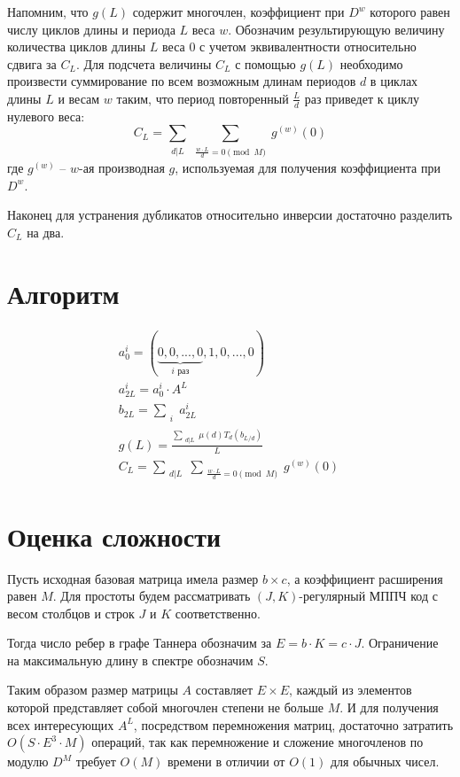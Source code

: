 Напомним, что $g(L)$ содержит многочлен, коэффициент при $D^w$ которого равен числу циклов длины и периода $L$ веса $w$.
Обозначим результирующую величину количества циклов длины $L$ веса 0 с учетом эквивалентности относительно сдвига за $C_L$.
Для подсчета величины $C_L$ с помощью $g(L)$ необходимо произвести суммирование по всем возможным длинам периодов $d$ в циклах
длины $L$ и весам $w$ таким, что период повторенный $\frac{L}{d}$ раз приведет к циклу нулевого веса:
\[
  C_L=\sum_{\substack{d|L}}\sum_{\substack{\frac{w \cdot L}{d} = 0 \pmod{M}}}g^{(w)}(0)
\]
где $g^{(w)}$ -- $w$-ая производная $g$, используемая для получения коэффициента при $D^w$.

Наконец для устранения дубликатов относительно инверсии достаточно разделить $C_L$ на два.

\section{Алгоритм}
\begin{eqnarray}
a_0^i=(\underbrace{0,0,...,0}_{i \text{ раз}},1,0,...,0) \label{aeq1} \\
a_{2L}^i=a_0^i \cdot A^L \label{aeq2} \\
b_{2L}=\sum_{\substack{i}}a_{2L}^i \label{aeq3} \\
  g(L) = \frac{\sum_{\substack{d|L}}\mu(d)T_d(b_{L/d})}{L} \label{aeq4} \\
  C_L=\sum_{\substack{d|L}}\sum_{\substack{\frac{w \cdot L}{d} = 0 \pmod{M}}}g^{(w)}(0) \label{aeq5} \
\end{eqnarray}

\section{Оценка сложности}

 Пусть исходная базовая  матрица имела размер $b \times c$, а коэффициент расширения равен $M$.
Для простоты будем рассматривать $(J,K)$-регулярный МППЧ код с 
весом столбцов и строк $J$ и $K$ соответственно. 

Тогда число ребер в графе Таннера обозначим за $E=b \cdot K = c \cdot J$.
Ограничение на максимальную длину в спектре обозначим $S$.

Таким образом размер матрицы $A$ составляет $E \times E$, каждый из элементов которой представляет
собой многочлен степени не больше $M$. И для получения
всех интересующих $A^L$, посредством перемножения матриц,
достаточно затратить $O(S \cdot E^3 \cdot M)$ операций, так как перемножение и сложение многочленов по модулю $D^M$
требует $O(M)$ времени в отличии от $O(1)$ для обычных чисел.

